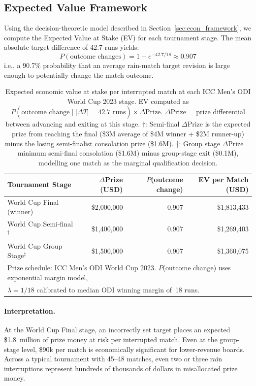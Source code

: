\documentclass[12pt,a4paper,oneside]{report}
\begin{document}
\subsection{Expected Value Framework}

Using the decision-theoretic model described in Section~\ref{sec:econ_framework}, we compute the Expected Value at Stake (EV) for each tournament stage.  The mean absolute target difference of 42.7 runs yields:
\[
P(\text{outcome changes}) = 1 - e^{-42.7/18} \approx 0.907
\]
i.e., a 90.7\% probability that an average rain-match target revision is large enough to potentially change the match outcome.

\begin{table}[htbp]
\centering
\caption[Expected economic value at stake in interrupted ICC tournament matches]{Expected economic value at stake per interrupted match at each ICC Men's ODI World Cup 2023 \citep{ICC2023prizes} stage.  EV computed as $P(\text{outcome change} \mid \overline{|\Delta T|}=42.7\text{ runs}) \times \Delta\text{Prize}$.  $\Delta$Prize = prize differential between advancing and exiting at this stage.  $\dagger$: Semi-final $\Delta$Prize is the expected prize from reaching the final (\$3M average of \$4M winner + \$2M runner-up) minus the losing semi-finalist consolation prize (\$1.6M).  $\ddagger$: Group stage $\Delta$Prize = minimum semi-final consolation (\$1.6M) minus group-stage exit (\$0.1M), modelling one match as the marginal qualification decision.}
\label{tab:econ_value}
\small
\begin{tabular}{lrrr}
\toprule
\textbf{Tournament Stage} & \textbf{$\Delta$Prize (USD)} & \textbf{$P$(outcome change)} & \textbf{EV per Match (USD)} \\
\midrule
World Cup Final (winner)     & \$2,000,000   & 0.907 & \$1,813,433 \\
World Cup Semi-final$^\dagger$ & \$1,400,000 & 0.907 & \$1,269,403 \\
World Cup Group Stage$^\ddagger$ & \$1,500,000 & 0.907 & \$1,360,075 \\
\bottomrule
\multicolumn{4}{l}{\small Prize schedule: ICC Men's ODI World Cup 2023.  $P$(outcome change) uses exponential margin model,} \\
\multicolumn{4}{l}{\small $\lambda=1/18$ calibrated to median ODI winning margin of~18 runs.} \\
\end{tabular}
\end{table}

\paragraph{Interpretation.}  At the World Cup Final stage, an incorrectly set target places an expected \$1.8~million of prize money at risk per interrupted match.  Even at the group-stage level, \$90k per match is economically significant for lower-revenue boards.  Across a typical tournament with 45--48 matches, even two or three rain interruptions represent hundreds of thousands of dollars in misallocated prize money.
\end{document}
